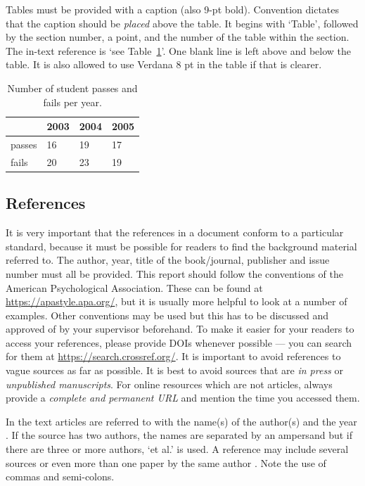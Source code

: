 Tables must be provided with a caption (also 9-pt bold).
Convention dictates that the caption should be \emph{placed} above the table.
It begins with `Table', followed by the section number, a point, and the number of the table within the section.
The in-text reference is `see Table~\ref{tab:some_table}'.
One blank line is left above and below the table.
It is also allowed to use Verdana 8 pt in the table if that is clearer.

\begin{table}[h]
  \centering
  \caption{Number of student passes and fails per year.}\label{tab:some_table}
  \begin{tabular}{llll}
    \toprule
    & 2003 & 2004 & 2005 \\
    \midrule
    passes & 16 & 19 & 17 \\
    fails & 20 & 23 & 19 \\
    \bottomrule
  \end{tabular}
\end{table}

\subsection{References}\label{sec:_references}
It is very important that the references in a document conform to a particular standard, because it must be possible for readers to find the background material referred to.
The author, year, title of the book/journal, publisher and issue number must all be provided.
This report should follow the conventions of the American Psychological Association.
These can be found at \url{https://apastyle.apa.org/}, but it is usually more helpful to look at a number of examples.
Other conventions may be used but this has to be discussed and approved of by your supervisor beforehand.
To make it easier for your readers to access your references, please provide DOIs whenever possible --- you can search for them at \url{https://search.crossref.org/}.
It is important to avoid references to vague sources as far as possible.
It is best to avoid sources that are \emph{in press} or \emph{unpublished manuscripts}.
For online resources which are not articles, always provide a \emph{complete and permanent URL} and mention the time you accessed them.

In the text articles are referred to with the name(s) of the author(s) and the year \citep{dawkins76}.
If the source has two authors, the names are separated by an ampersand \citep{berrah99} but if there are three or more authors, ‘et al.’ is used\citep{schwartz97}.
A reference may include several sources \citep{cooper52, Crothers78} or even more than one paper by the same author \citep{Kirby98, Kirby99, Kirby00, Oliphant93, Oliphant96}.
Note the use of commas and semi-colons.

